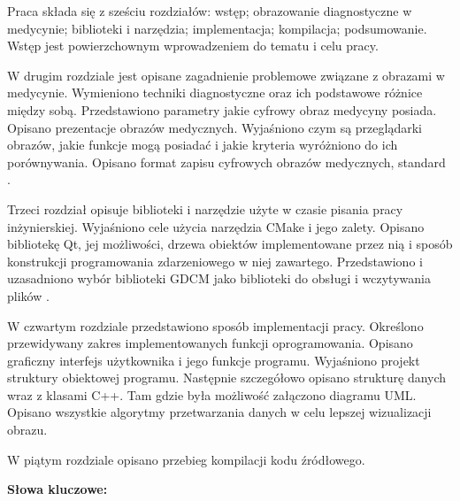 \begin{center}
\large \bf
\thetitle
\end{center}

Praca składa się z sześciu rozdziałów: wstęp; obrazowanie diagnostyczne w medycynie; biblioteki i narzędzia; implementacja; kompilacja; podsumowanie.
Wstęp jest powierzchownym wprowadzeniem do tematu i celu pracy.
\par
W drugim rozdziale jest opisane zagadnienie problemowe związane z obrazami w medycynie.
Wymieniono techniki diagnostyczne oraz ich podstawowe różnice między sobą.
Przedstawiono parametry jakie cyfrowy obraz medycyny posiada.
Opisano prezentacje obrazów medycznych.
Wyjaśniono czym są przeglądarki obrazów, jakie funkcje mogą posiadać i jakie kryteria wyróżniono do ich porównywania.
Opisano format zapisu cyfrowych obrazów medycznych, standard \DICOM.
\par
Trzeci rozdział opisuje biblioteki i narzędzie użyte w czasie pisania pracy inżynierskiej.
Wyjaśniono cele użycia narzędzia CMake i jego zalety.
Opisano bibliotekę Qt, jej możliwości, drzewa obiektów implementowane przez nią i sposób konstrukcji programowania zdarzeniowego w niej zawartego.
Przedstawiono i uzasadniono wybór biblioteki GDCM jako biblioteki do obsługi i wczytywania plików \DICOM.
\par
W czwartym rozdziale przedstawiono sposób implementacji pracy.
Określono przewidywany zakres implementowanych funkcji oprogramowania.
Opisano graficzny interfejs użytkownika i jego funkcje programu.
Wyjaśniono projekt struktury obiektowej programu.
Następnie szczegółowo opisano strukturę danych wraz z klasami C++.
Tam gdzie była możliwość załączono diagramu UML.
Opisano wszystkie algorytmy przetwarzania danych w celu lepszej wizualizacji obrazu.
\par
W piątym rozdziale opisano przebieg kompilacji kodu źródłowego.

\bigskip
{\noindent\bf Słowa kluczowe:} \keywords

\vfill